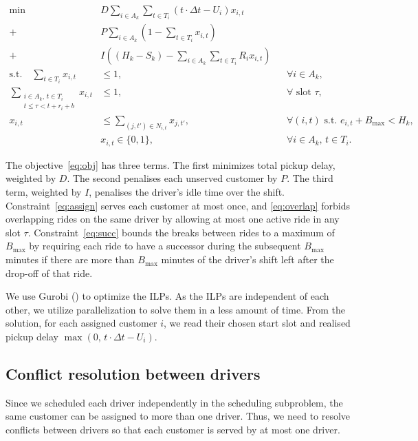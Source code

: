 \begin{align}
\min \quad & D \sum_{i \in A_k} \sum_{t \in T_i} (t \cdot \Delta t - U_i) x_{i,t} \\
    +\quad & P \sum_{i \in A_k} ( 1 - \sum_{t \in T_i} x_{i,t} ) \\
    +\quad & I ( (H_k - S_k) - \sum_{i \in A_k} \sum_{t \in T_i} R_i x_{i,t} ) \label{eq:obj} \\
\text{s.t.} \quad 
\sum_{t \in T_i} x_{i,t} &\leq 1, && \forall i \in A_k, \label{eq:assign} \\
\sum_{\substack{i \in A_k, \, t \in T_i \\ t \leq \tau < t + r_i + b}} x_{i,t} &\leq 1, && \forall \text{ slot } \tau, \label{eq:overlap} \\
x_{i,t} &\leq \sum_{(j,t') \in N_{i,t}} x_{j,t'}, && \forall (i,t) \text{ s.t. } e_{i,t} + B_{\max} < H_k, \label{eq:succ} \\
& x_{i,t} \in \{0, 1\}, && \forall i \in A_k, \, t \in T_i. \label{eq:integrality}
\end{align}

The objective~\eqref{eq:obj} has three terms. The first minimizes total pickup delay, weighted by $D$. The second penalises each unserved customer by $P$. The third term, weighted by $I$, penalises the driver's idle time over the shift. Constraint~\eqref{eq:assign} serves each customer at most once, and \eqref{eq:overlap} forbids overlapping rides on the same driver by allowing at most one active ride in any slot $\tau$. Constraint~\eqref{eq:succ} bounds the breaks between rides to a maximum of $B_{\max}$ by requiring each ride to have a successor during the subsequent $B_{\max}$ minutes if there are more than $B_{\max}$ minutes of the driver's shift left after the drop-off of that ride. 

We use Gurobi (\citep{gurobi}) to optimize the ILPs. As the ILPs are independent of each other, we utilize parallelization to solve them in a less amount of time. From the solution, for each assigned customer $i$, we read their chosen start slot and realised pickup delay $\max(0,\, t \cdot \Delta t - U_i)$.

\subsection{Conflict resolution between drivers}

Since we scheduled each driver independently in the scheduling subproblem, the same customer can be assigned to more than one driver. Thus, we need to resolve conflicts between drivers so that each customer is served by at most one driver.

